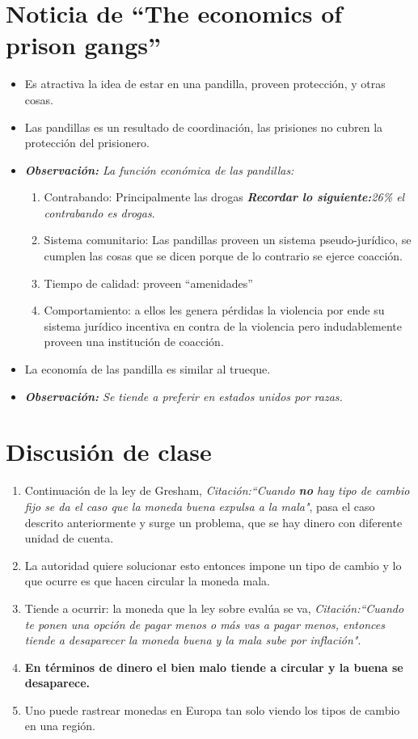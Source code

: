 \section{Noticia de ``The economics of prison gangs''}
\begin{itemize}
    \item Es atractiva la idea de estar en una pandilla, proveen protección, y otras cosas.
    \item Las pandillas es un resultado de coordinación, las prisiones no cubren la protección del prisionero.
    \item \emph{\textbf{Observación: }La función económica de las pandillas:}
        \begin{enumerate}
            \item Contrabando: Principalmente las drogas \emph{\textbf{Recordar lo siguiente:}26\%  el contrabando es drogas}.
            \item Sistema comunitario: Las pandillas proveen un sistema pseudo-jurídico, se cumplen las cosas que se dicen porque de lo contrario se ejerce coacción. 
            \item Tiempo de calidad: proveen ``amenidades''
            \item Comportamiento: a ellos les genera pérdidas la violencia por ende su sistema jurídico incentiva en contra de la violencia pero indudablemente proveen una institución de coacción.
        \end{enumerate}
    
    \item La economía de las pandilla es similar al trueque.
    \item \emph{\textbf{Observación: }Se tiende a preferir en estados unidos por razas.}
\end{itemize}

\section{Discusión de clase}
\begin{enumerate}
    \item Continuación de la ley de Gresham, \emph{Citación:``Cuando \textbf{no} hay tipo de cambio fijo se da el caso que la moneda buena expulsa a la mala"}, pasa el caso descrito anteriormente y surge un problema, que se hay dinero con diferente unidad de cuenta.
    \item La autoridad quiere solucionar esto entonces impone un tipo de cambio y lo que ocurre es que hacen circular la moneda mala.
    \item Tiende a ocurrir: la moneda que la ley sobre evalúa se va, \emph{Citación:``Cuando te ponen una opción de pagar menos o más vas a pagar menos, entonces tiende a desaparecer la moneda buena y la mala sube por inflación"}.
    \item \textbf{En términos de dinero el bien malo tiende a circular y la buena se desaparece.}
    \item Uno puede rastrear monedas en Europa tan solo viendo los tipos de cambio en una región.
\end{enumerate}

